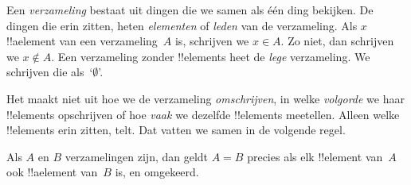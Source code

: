 \documentclass[openany]{memoir}
\begin{document}
\begingroup
\def\olfilename{OLP-0004}
\def\olfilepath{content/sets-functions-relations/sets/}
\hypertarget{unit-OLP-0004}{}



\endgroup

\begingroup
\def\olfilename{OLP-0005}
\def\olfilepath{content/sets-functions-relations/sets/}
\hypertarget{unit-OLP-0005}{}




Een \emph{verzameling} bestaat uit dingen die we samen als één ding
bekijken. De dingen die erin zitten, heten \emph{elementen} of
\emph{leden} van de verzameling. Als $x$ !!a{element} van een
verzameling~$A$ is, schrijven we $x \in A$. Zo niet, dan schrijven we
$x \notin A$. Een verzameling zonder !!{element}s heet de
\emph{lege} verzameling. We schrijven die als~‘$\emptyset$’.

\begin{explain}
Het maakt niet uit hoe we de verzameling \emph{omschrijven}, in welke
\emph{volgorde} we haar !!{element}s opschrijven of hoe \emph{vaak}
we dezelfde !!{element}s meetellen. Alleen welke !!{element}s erin
zitten, telt. Dat
vatten we samen in de volgende regel.
\end{explain}

\begin{defn}[Extensionaliteit]
  Als $A$ en $B$ verzamelingen zijn, dan geldt $A = B$ precies als elk
  !!{element} van~$A$ ook !!a{element} van~$B$ is, en omgekeerd.
\end{defn}
\end{document}
